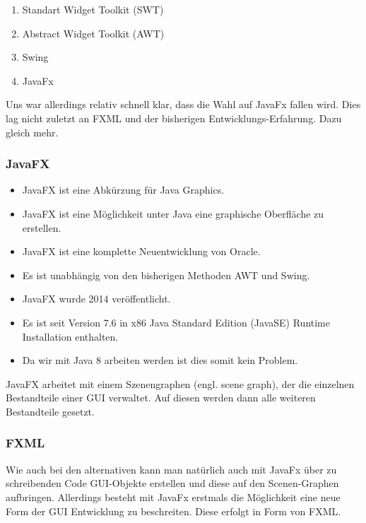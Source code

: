 \documentclass{article}
\begin{document}
			\begin{enumerate}
				\item Standart Widget Toolkit (SWT)
				\item Abstract Widget Toolkit (AWT)
				\item Swing
				\item JavaFx
			\end{enumerate}

		Uns war allerdings relativ schnell klar, dass die Wahl auf JavaFx fallen wird.
		Dies lag nicht zuletzt an FXML und der bisherigen Entwicklungs-Erfahrung.
		Dazu gleich mehr.
		
			\subsubsection{JavaFX}
			\begin{itemize}
			\item JavaFX ist eine Abkürzung für Java Graphics.
			\item JavaFX ist eine Möglichkeit unter Java eine graphische Oberfläche zu erstellen.
			\item JavaFX ist eine komplette Neuentwicklung von Oracle.
			\item Es ist unabhängig von den bisherigen Methoden AWT und Swing.
			\item JavaFX wurde 2014 veröffentlicht.
			\item Es ist seit Version 7.6 in x86 Java Standard Edition (JavaSE) Runtime Installation enthalten.
			\item Da wir mit Java 8 arbeiten werden ist dies somit kein Problem.
			\end{itemize}
			
			JavaFX arbeitet mit einem Szenengraphen (engl. scene graph), der die einzelnen Bestandteile einer GUI verwaltet.
			Auf diesen werden dann alle weiteren Bestandteile gesetzt.
			
			\subsubsection{FXML}
				Wie auch bei den alternativen kann man natürlich auch mit JavaFx über zu schreibenden Code GUI-Objekte erstellen und diese auf den Scenen-Graphen aufbringen.
				Allerdings besteht mit JavaFx erstmals die Möglichkeit eine neue Form der GUI Entwicklung zu beschreiten.
				Diese erfolgt in Form von FXML.
				
\end{document}
